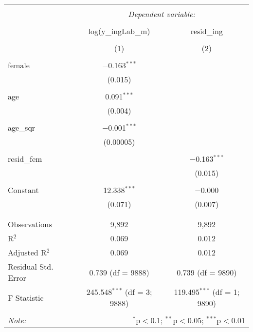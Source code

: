 
\begin{table}[!htbp] \centering 
  \caption{} 
  \label{} 
\begin{tabular}{@{\extracolsep{5pt}}lcc} 
\\[-1.8ex]\hline 
\hline \\[-1.8ex] 
 & \multicolumn{2}{c}{\textit{Dependent variable:}} \\ 
\cline{2-3} 
\\[-1.8ex] & log(y\_ingLab\_m) & resid\_ing \\ 
\\[-1.8ex] & (1) & (2)\\ 
\hline \\[-1.8ex] 
 female & $-$0.163$^{***}$ &  \\ 
  & (0.015) &  \\ 
  & & \\ 
 age & 0.091$^{***}$ &  \\ 
  & (0.004) &  \\ 
  & & \\ 
 age\_sqr & $-$0.001$^{***}$ &  \\ 
  & (0.00005) &  \\ 
  & & \\ 
 resid\_fem &  & $-$0.163$^{***}$ \\ 
  &  & (0.015) \\ 
  & & \\ 
 Constant & 12.338$^{***}$ & $-$0.000 \\ 
  & (0.071) & (0.007) \\ 
  & & \\ 
\hline \\[-1.8ex] 
Observations & 9,892 & 9,892 \\ 
R$^{2}$ & 0.069 & 0.012 \\ 
Adjusted R$^{2}$ & 0.069 & 0.012 \\ 
Residual Std. Error & 0.739 (df = 9888) & 0.739 (df = 9890) \\ 
F Statistic & 245.548$^{***}$ (df = 3; 9888) & 119.495$^{***}$ (df = 1; 9890) \\ 
\hline 
\hline \\[-1.8ex] 
\textit{Note:}  & \multicolumn{2}{r}{$^{*}$p$<$0.1; $^{**}$p$<$0.05; $^{***}$p$<$0.01} \\ 
\end{tabular} 
\end{table} 
